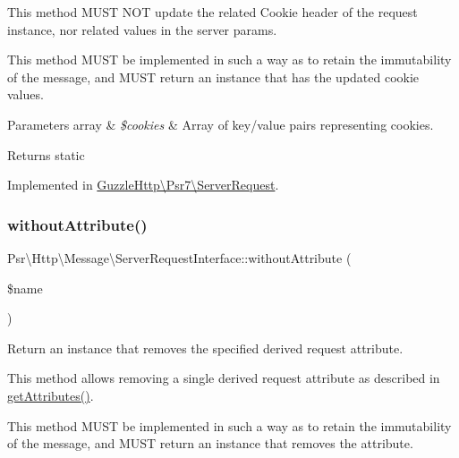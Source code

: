 This method M\+U\+ST N\+OT update the related Cookie header of the request instance, nor related values in the server params.

This method M\+U\+ST be implemented in such a way as to retain the immutability of the message, and M\+U\+ST return an instance that has the updated cookie values.


\begin{DoxyParams}[1]{Parameters}
array & {\em \$cookies} & Array of key/value pairs representing cookies. \\
\hline
\end{DoxyParams}
\begin{DoxyReturn}{Returns}
static 
\end{DoxyReturn}


Implemented in \hyperlink{classGuzzleHttp_1_1Psr7_1_1ServerRequest_a76832fc981394c140a13fe50c024fcd5}{Guzzle\+Http\textbackslash{}\+Psr7\textbackslash{}\+Server\+Request}.

\mbox{\label{interfacePsr_1_1Http_1_1Message_1_1ServerRequestInterface_a549f6aa6f534896b84b090ae10db23f6}} 
\subsubsection{\texorpdfstring{without\+Attribute()}{withoutAttribute()}}
{\footnotesize\ttfamily Psr\textbackslash{}\+Http\textbackslash{}\+Message\textbackslash{}\+Server\+Request\+Interface\+::without\+Attribute (\begin{DoxyParamCaption}\item[{}]{\$name }\end{DoxyParamCaption})}

Return an instance that removes the specified derived request attribute.

This method allows removing a single derived request attribute as described in \hyperlink{interfacePsr_1_1Http_1_1Message_1_1ServerRequestInterface_a0cda25a9b297c86e7813ffcb98ceb3df}{get\+Attributes()}.

This method M\+U\+ST be implemented in such a way as to retain the immutability of the message, and M\+U\+ST return an instance that removes the attribute.


